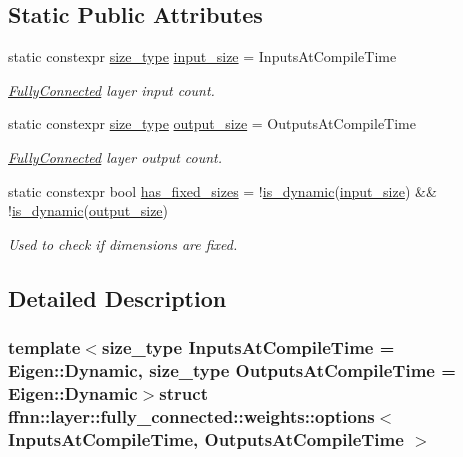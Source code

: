 \subsection*{Static Public Attributes}
\begin{DoxyCompactItemize}
\item 
static constexpr \hyperlink{namespaceffnn_a63b90a2fd70eb76684eac482a51633e5}{size\-\_\-type} \hyperlink{structffnn_1_1layer_1_1fully__connected_1_1weights_1_1options_aa9973b3dcef51f2684f3c36bbeccd767}{input\-\_\-size} = Inputs\-At\-Compile\-Time
\begin{DoxyCompactList}\small\item\em \hyperlink{classffnn_1_1layer_1_1_fully_connected}{Fully\-Connected} layer input count. \end{DoxyCompactList}\item 
static constexpr \hyperlink{namespaceffnn_a63b90a2fd70eb76684eac482a51633e5}{size\-\_\-type} \hyperlink{structffnn_1_1layer_1_1fully__connected_1_1weights_1_1options_a45dac283a1611df3497baf255d8645c1}{output\-\_\-size} = Outputs\-At\-Compile\-Time
\begin{DoxyCompactList}\small\item\em \hyperlink{classffnn_1_1layer_1_1_fully_connected}{Fully\-Connected} layer output count. \end{DoxyCompactList}\item 
static constexpr bool \hyperlink{structffnn_1_1layer_1_1fully__connected_1_1weights_1_1options_acb66c282ebaa5f29ce34d14b68551b94}{has\-\_\-fixed\-\_\-sizes} = !\hyperlink{namespaceffnn_1_1layer_a83ba223c7b7eb8e3d926b98b266f24c8}{is\-\_\-dynamic}(\hyperlink{structffnn_1_1layer_1_1fully__connected_1_1weights_1_1options_aa9973b3dcef51f2684f3c36bbeccd767}{input\-\_\-size}) \&\& !\hyperlink{namespaceffnn_1_1layer_a83ba223c7b7eb8e3d926b98b266f24c8}{is\-\_\-dynamic}(\hyperlink{structffnn_1_1layer_1_1fully__connected_1_1weights_1_1options_a45dac283a1611df3497baf255d8645c1}{output\-\_\-size})
\begin{DoxyCompactList}\small\item\em Used to check if dimensions are fixed. \end{DoxyCompactList}\end{DoxyCompactItemize}


\subsection{Detailed Description}
\subsubsection*{template$<$size\-\_\-type Inputs\-At\-Compile\-Time = Eigen\-::\-Dynamic, size\-\_\-type Outputs\-At\-Compile\-Time = Eigen\-::\-Dynamic$>$struct ffnn\-::layer\-::fully\-\_\-connected\-::weights\-::options$<$ Inputs\-At\-Compile\-Time, Outputs\-At\-Compile\-Time $>$}

